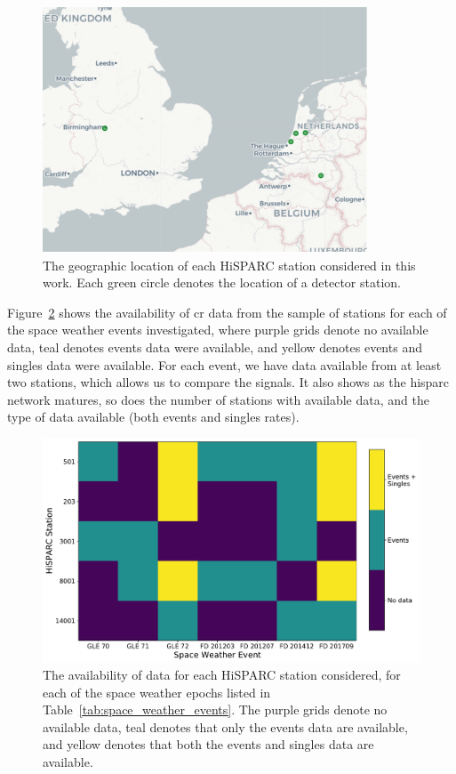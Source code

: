 \begin{figure}[htbp!]
	\centering
	\includegraphics[width=0.7\columnwidth]{HS_station_map.pdf}
	\caption{The geographic location of each HiSPARC station considered in this work. Each green circle denotes the location of a detector station.}
	\label{fig:HS_map}
\end{figure}


Figure~\ref{fig:HS_data_availability} shows the availability of \gls{cr} data from the sample of stations for each of the space weather events investigated, where purple grids denote no available data, teal denotes events data were available, and yellow denotes events and singles data were available. For each event, we have data available from at least two stations, which allows us to compare the signals. It also shows as the \gls{hisparc} network matures, so does the number of stations with available data, and the type of data available (both events and singles rates).

\begin{figure}[htbp!]
	\centering
	\includegraphics[width=0.85\columnwidth]{HS_data_availaviblity_map.pdf}
	\caption{The availability of data for each HiSPARC station considered, for each of the space weather epochs listed in Table~\ref{tab:space_weather_events}. The purple grids denote no available data, teal denotes that only the events data are available, and yellow denotes that both the events and singles data are available.}
	\label{fig:HS_data_availability}
\end{figure}





